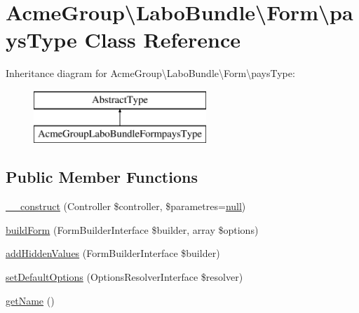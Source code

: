 \hypertarget{class_acme_group_1_1_labo_bundle_1_1_form_1_1pays_type}{\section{Acme\+Group\textbackslash{}Labo\+Bundle\textbackslash{}Form\textbackslash{}pays\+Type Class Reference}
\label{class_acme_group_1_1_labo_bundle_1_1_form_1_1pays_type}
}
Inheritance diagram for Acme\+Group\textbackslash{}Labo\+Bundle\textbackslash{}Form\textbackslash{}pays\+Type\+:\begin{figure}[H]
\begin{center}
\leavevmode
\includegraphics[height=2.000000cm]{class_acme_group_1_1_labo_bundle_1_1_form_1_1pays_type}
\end{center}
\end{figure}
\subsection*{Public Member Functions}
\begin{DoxyCompactItemize}
\item 
\hyperlink{class_acme_group_1_1_labo_bundle_1_1_form_1_1pays_type_add613ee39a006df8e741472fda3012a3}{\+\_\+\+\_\+construct} (Controller \$controller, \$parametres=\hyperlink{validate_8js_afb8e110345c45e74478894341ab6b28e}{null})
\item 
\hyperlink{class_acme_group_1_1_labo_bundle_1_1_form_1_1pays_type_a6aaf3db7c214857785f90a3b182d673e}{build\+Form} (Form\+Builder\+Interface \$builder, array \$options)
\item 
\hyperlink{class_acme_group_1_1_labo_bundle_1_1_form_1_1pays_type_a2f1282d28e122edbce6b9a08def122b1}{add\+Hidden\+Values} (Form\+Builder\+Interface \$builder)
\item 
\hyperlink{class_acme_group_1_1_labo_bundle_1_1_form_1_1pays_type_aaad362ec2d80439c15f0dddabe554cac}{set\+Default\+Options} (Options\+Resolver\+Interface \$resolver)
\item 
\hyperlink{class_acme_group_1_1_labo_bundle_1_1_form_1_1pays_type_a040b8e4eec73e1ad4eac7b09af539b8d}{get\+Name} ()
\end{DoxyCompactItemize}


